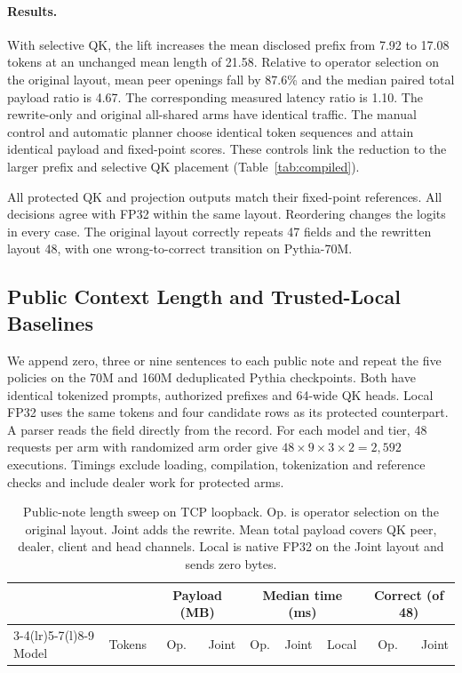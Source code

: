 \documentclass[runningheads]{llncs}
\begin{document}
\paragraph{Results.}
With selective QK, the lift increases the mean disclosed prefix from
7.92 to 17.08 tokens at an unchanged mean length of 21.58.
Relative to operator selection on the original layout, mean peer
openings fall by 87.6\% and the median paired total payload ratio is
4.67. The corresponding measured latency ratio is 1.10. The
rewrite-only and original all-shared arms have identical traffic.
The manual control and automatic planner choose identical token
sequences and attain identical payload and fixed-point scores.
These controls link the reduction to the larger prefix and selective
QK placement (Table~\ref{tab:compiled}).

All protected QK and projection outputs match their fixed-point
references. All decisions agree with FP32 within the same layout.
Reordering changes the logits in every case. The original layout
correctly repeats 47 fields and the rewritten layout 48, with one
wrong-to-correct transition on Pythia-70M.

\subsection{Public Context Length and Trusted-Local Baselines}
\label{sec:scale}
We append zero, three or nine sentences to each public note and repeat
the five policies on the 70M and 160M deduplicated Pythia checkpoints.
Both have identical tokenized prompts, authorized prefixes and 64-wide
QK heads. Local FP32 uses the same tokens and four candidate rows as its
protected counterpart. A parser reads the field directly from the record.
For each model and tier, 48 requests per arm with randomized arm order
give $48\times9\times3\times2=2{,}592$ executions. Timings exclude loading,
compilation, tokenization and reference checks and include dealer work
for protected arms.

\begin{table}[!ht]
\centering
\caption{Public-note length sweep on TCP loopback. Op. is operator
selection on the original layout. Joint adds the rewrite. Mean total
payload covers QK peer, dealer, client and head channels. Local is native
FP32 on the Joint layout and sends zero bytes.}
\label{tab:scale}
\small\renewcommand{\arraystretch}{1.1}\setlength{\tabcolsep}{4pt}
\begin{tabular}{@{}llrrrrrrr@{}}
\toprule
& & \multicolumn{2}{c}{Payload (MB)} & \multicolumn{3}{c}{Median time (ms)} &
\multicolumn{2}{c}{Correct (of 48)}\\
\cmidrule(lr){3-4}\cmidrule(lr){5-7}\cmidrule(l){8-9}
Model & Tokens & Op. & Joint & Op. & Joint & Local & Op. & Joint\\
\midrule

\end{tabular}
\end{table}
\end{document}
